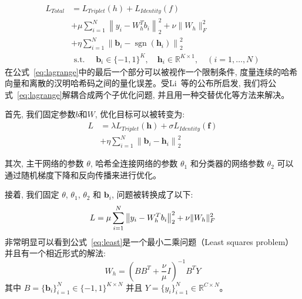 \begin{equation}
    \begin{aligned}
L_{Total} &= L_{Triplet}(h) + L_{Identity}(f) \\
&+\mu \sum_{i=1}^{N}\left\|y_{i}-W^{T}_h b_{i}\right\|_{2}^{2}+\nu\|W_h\|_{F}^{2} \\ 
     &+ \eta \sum_{i=1}^{N}\left\|\mathbf{b}_{i}-\operatorname{sgn}\left(\mathbf{h}_{i}\right)\right\|_{2}^{2} \\
&\text { s.t. } \quad \mathbf{b}_{i} \in \{-1,1\}^K, \quad \mathbf{h}_{i} \in \mathbb{R}^{K \times 1}, \quad(i=1, \ldots, N)
\end{aligned}
\label{eq:lagrange}
\end{equation}
在公式~\ref{eq:lagrange}中的最后一个部分可以被视作一个限制条件, 度量连续的哈希向量和离散的汉明哈希码之间的量化误差。受Li~\cite{li2017deep}等的公布所启发, 我们将公式~\ref{eq:lagrange}解耦合成两个子优化问题, 并且用一种交替优化等方法来解决。 \par
首先, 我们固定参数$b$和$W$, 优化目标可以被转变为:
\begin{equation}
    \begin{aligned}
        L &= \lambda L_{Triplet}(\mathbf{h}) + \sigma L_{Identity}(\mathbf{f}) \\
        &+ \eta \sum_{i=1}^{N}\left\|\mathbf{b}_{i}-\mathbf{h}_{i}\right\|_{2}^{2}
    \end{aligned}
    \label{eq:sgd}
    \end{equation} \par
其次, 主干网络的参数 $\theta$, 哈希全连接网络的参数 $\theta_1$ 和分类器的网络参数 $\theta_2$ 可以通过随机梯度下降和反向传播来进行优化。\par
接着, 我们固定  $\theta$, $\theta_1$, $\theta_2$ 和 $\mathbf{b}_i$, 问题被转换成了以下:
\begin{equation}
    L = \mu \sum_{i=1}^{N}\left\|y_{i}-W_h^{T} b_{i}\right\|_{2}^{2}+\nu\|W_h\|_{F}^{2} \\ 
    \label{eq:least}
\end{equation}
非常明显可以看到公式~\ref{eq:least}是一个最小二乘问题（Least squares problem）并且有一个相近形式的解法:
\begin{equation}
    W_h=\left(B B^{T}+\frac{\nu}{\mu} I\right)^{-1} B^{T} Y
    \label{eq:least1}
\end{equation}
其中 $B = \{\mathbf{b}_i\}_{i=1}^N \in\{-1,1\}^{K \times N}$ 并且 $Y = \{y_i\}^N_{i=1} \in \mathbb{R}^{C \times N}$。\par

